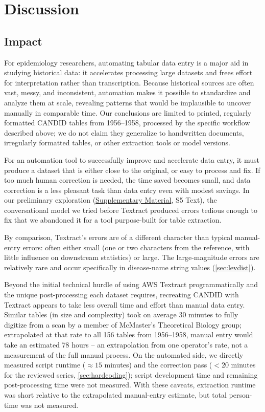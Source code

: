 \documentclass[12pt]{article}
\begin{document}
\clearpage

\section{Discussion}


\subsection{Impact}\label{sec:impact}
For epidemiology researchers, automating tabular data entry is a major aid in studying historical data: it accelerates processing large datasets and frees effort for interpretation rather than transcription. Because historical sources are often vast, messy, and inconsistent, automation makes it possible to standardize and analyze them at scale, revealing patterns that would be implausible to uncover manually in comparable time. Our conclusions are limited to printed, regularly formatted CANDID tables from 1956--1958, processed by the specific workflow described above; we do not claim they generalize to handwritten documents, irregularly formatted tables, or other extraction tools or model versions.

For an automation tool to successfully improve and accelerate data entry, it must produce a dataset that is either close to the original, or easy to process and fix. If too much human correction is needed, the time saved becomes small, and data correction is a less pleasant task than data entry even with modest savings. In our preliminary exploration (\hyperref[sec:supp]{Supplementary Material}, S5 Text), the conversational model we tried before Textract produced errors tedious enough to fix that we abandoned it for a tool purpose-built for table extraction.

By comparison, Textract's errors are of a different character than typical manual-entry errors: often either small (one or two characters from the reference, with little influence on downstream statistics) or large. The large-magnitude errors are relatively rare and occur specifically in disease-name string values (\cref{sec:levdist}).

Beyond the initial technical hurdle of using AWS Textract programmatically and the unique post-processing each dataset requires, recreating CANDID with Textract appears to take less overall time and effort than manual data entry. Similar tables (in size and complexity) took on average 30 minutes to fully digitize from a scan by a member of McMaster's Theoretical Biology group; extrapolated at that rate to all 156 tables from 1956--1958, manual entry would take an estimated 78 hours -- an extrapolation from one operator's rate, not a measurement of the full manual process. On the automated side, we directly measured script runtime ($\approx15$ minutes) and the correction pass ($<20$ minutes for the reviewed series, \cref{sec:hardcoding}); script development time and remaining post-processing time were not measured. With these caveats, extraction runtime was short relative to the extrapolated manual-entry estimate, but total person-time was not measured.
\end{document}
